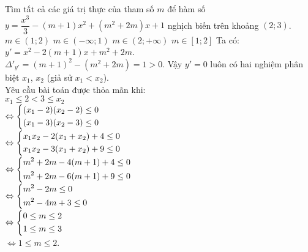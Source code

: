 \begin{ex}%
Tìm tất cả các giá trị thực của tham số $m$ để hàm số $y=\dfrac{x^3}{3}-(m+1)x^2+(m^2+2m)x+1$ nghịch biến trên khoảng $(2;3)$.
 \choice
  {$m\in (1;2)$}
  {$m\in (-\infty;1)$}
  {$m\in (2;+\infty)$}
  {\True $m\in \left[1;2\right]$}
 \loigiai
  {
  Ta có: $y'=x^2-2(m+1)x+m^2+2m$.\\
  $\Delta'_{y'}=(m+1)^2-(m^2+2m)=1>0$. Vậy $y'=0$ luôn có hai nghiệm phân biệt $x_1$, $x_2$ (giả sử $x_1 < x_2$).\\
  Yêu cầu bài toán được thỏa mãn khi:\\
  \hspace*{.8cm}$x_1 \leq 2 < 3 \leq x_2$\\
  $\Leftrightarrow  \left\{\begin{aligned}&(x_1-2)(x_2-2)\leq 0\\& (x_1-3)(x_2-3)\leq 0\end{aligned}\right.$\\
  $\Leftrightarrow  \left\{\begin{aligned}&x_1x_2-2(x_1+x_2)+4\leq 0\\& x_1x_2-3(x_1+x_2)+9\leq 0\end{aligned}\right.$\\
  $\Leftrightarrow  \left\{\begin{aligned}&m^2+2m-4(m+1)+4 \leq 0 \\&m^2+2m-6(m+1)+9 \leq 0 \end{aligned}\right.$\\
  $\Leftrightarrow  \left\{\begin{aligned}&m^2-2m \leq 0 \\& m^2-4m+3 \leq 0\end{aligned}\right.$\\
  $\Leftrightarrow  \left\{\begin{aligned}& 0 \leq m \leq 2 \\&1 \leq m \leq 3\end{aligned}\right.$\\
  $\Leftrightarrow  1 \leq m \leq 2$.
  }
\end{ex}



